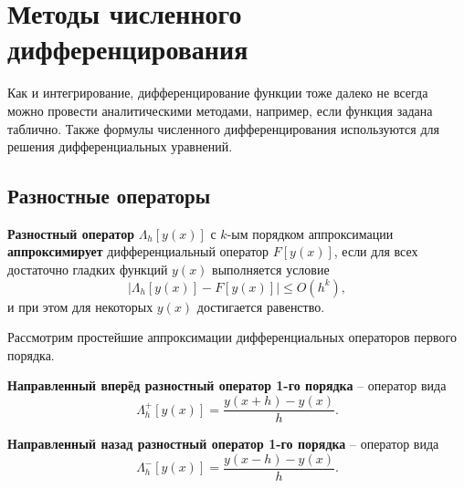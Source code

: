 \documentclass[../main.tex]{subfile}
\begin{document}
\section{Методы численного дифференцирования}
Как и интегрирование, дифференцирование функции тоже далеко не всегда можно
провести аналитическими методами, например, если функция задана таблично. Также
формулы численного дифференцирования используются для решения дифференциальных
уравнений.

\subsection{Разностные операторы}
\begin{define}
	\textbf{Разностный оператор} $\Lambda_h[y(x)]$ с $k$-ым порядком
	аппроксимации \textbf{аппроксимирует} дифференциальный оператор
	$F[y(x)]$, если для всех достаточно гладких функций $y(x)$ выполняется
	условие
	\[\big|\Lambda_h[y(x)]-F[y(x)]\big|\le O(h^k),\]
	и при этом для некоторых $y(x)$ достигается равенство.
\end{define}

Рассмотрим простейшие аппроксимации дифференциальных операторов первого порядка.

\begin{define}
	\textbf{Направленный вперёд разностный оператор 1-го порядка} --
	оператор вида
	\[\Lambda_h^+[y(x)]=\frac{y(x+h)-y(x)}{h}.\]

	\textbf{Направленный назад разностный оператор 1-го порядка} --
	оператор вида
	\[\Lambda_h^-[y(x)]=\frac{y(x-h)-y(x)}{h}.\]
\end{define}
\end{document}
